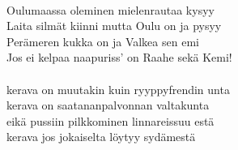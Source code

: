 \hspace{10mm} \\
Oulumaassa oleminen mielenrautaa kysyy \\
Laita silmät kiinni mutta Oulu on ja pysyy \\
Perämeren kukka on ja Valkea sen emi \\
Jos ei kelpaa naapuriss’ on Raahe sekä Kemi! \\
\hspace{10mm} \\
kerava on muutakin kuin ryyppyfrendin unta \\
kerava on saatananpalvonnan valtakunta \\
eikä pussiin pilkkominen linnareissuu estä \\
kerava jos jokaiselta löytyy sydämestä \\